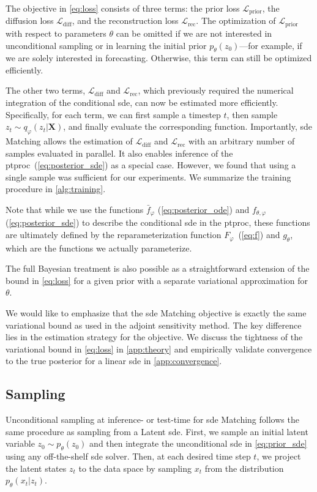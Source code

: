 \documentclass{article}
\def\X{\mathbf{X}}
\def\ph{\varphi}
\def\th{\theta}
\def\barf{\bar{f}}
\def\L{\mathcal{L}}
\def\Lrec{{\L_\mathrm{rec}}}
\def\Ldiff{{\L_\mathrm{diff}}}
\def\Lprior{{\L_\mathrm{prior}}}
\theoremstyle{plain}
\theoremstyle{definition}
\theoremstyle{remark}
\begin{document}
The objective in \cref{eq:loss} consists of three terms: the prior loss $\Lprior$, the diffusion loss $\Ldiff$, and the reconstruction loss $\Lrec$. The optimization of $\Lprior$ with respect to parameters $\th$ can be omitted if we are not interested in unconditional sampling or in learning the initial prior $p_\th(z_0)$—for example, if we are solely interested in forecasting. Otherwise, this term can still be optimized efficiently.


The other two terms, $\Ldiff$ and $\Lrec$, which previously required the numerical integration of the conditional \gls{sde}, can now be estimated more efficiently. Specifically, for each term, we can first sample a timestep $t$, then sample $z_t \sim q_\ph(z_t|\X)$, and finally evaluate the corresponding function. Importantly, \gls{sde} Matching allows the estimation of $\Ldiff$ and $\Lrec$ with an arbitrary number of samples evaluated in parallel. It also enables inference of the \gls{ptproc}~(\cref{eq:posterior_sde}) as a special case. However, we found that using a single sample was sufficient for our experiments. We summarize the training procedure in \cref{alg:training}.


Note that while we use the functions $\barf_\ph$ (\cref{eq:posterior_ode}) and $f_{\th,\ph}$ (\cref{eq:posterior_sde}) to describe the conditional \gls{sde} in the \gls{ptproc}, these functions are ultimately defined by the reparameterization function $F_\ph$~(\cref{eq:f}) and $g_\th$, which are the functions we actually parameterize.


The full Bayesian treatment is also possible as a straightforward extension of the bound in \cref{eq:loss} for a given prior with a separate variational approximation for $\th$.


We would like to emphasize that the \gls{sde} Matching objective is exactly the same variational bound as used in the adjoint sensitivity method. The key difference lies in the estimation strategy for the objective. We discuss the tightness of the variational bound in \cref{eq:loss} in \cref{app:theory} and empirically validate convergence to the true posterior for a linear \gls{sde} in \cref{app:convergence}.


\subsection{Sampling}


Unconditional sampling at inference- or test-time for \gls{sde} Matching follows the same procedure as sampling from a Latent \gls{sde}. First, we sample an initial latent variable $z_0 \sim p_\th(z_0)$ and then integrate the unconditional \gls{sde} in \cref{eq:prior_sde} using any off-the-shelf \gls{sde} solver. Then, at each desired time step $t$, we project the latent states $z_t$ to the data space by sampling $x_t$ from the distribution $p_\th(x_t|z_t)$.
\end{document}
